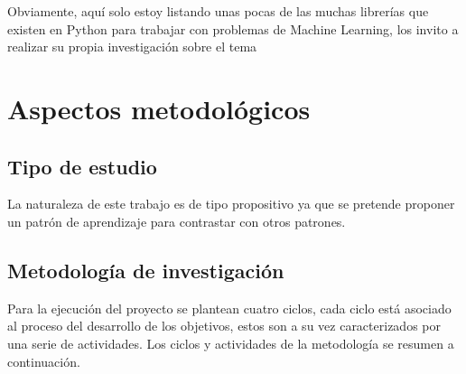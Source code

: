Obviamente, aquí solo estoy listando unas pocas de las muchas librerías que existen en Python para trabajar con problemas de Machine Learning, los invito a realizar su propia investigación sobre el tema


\section{Aspectos metodológicos}

\subsection{Tipo de estudio}

La naturaleza de este trabajo es de tipo propositivo ya que se pretende proponer un patrón de aprendizaje para contrastar con otros patrones.

\subsection{Metodología de investigación}

Para la ejecución del proyecto se plantean cuatro ciclos, cada ciclo está asociado al proceso del desarrollo de los objetivos, estos son a su vez caracterizados por una serie de actividades. Los ciclos y actividades de la metodología se resumen a continuación.

